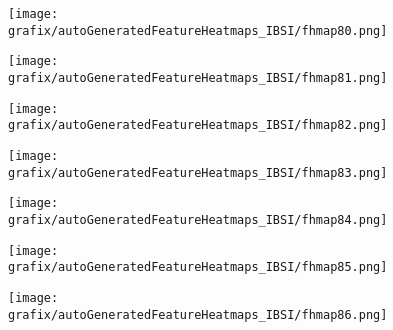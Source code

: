 \hspace{\hsp} 
\begin{subfigure}{\wid\textwidth} 
    \centering 
    \caption{\tiny \sffamily {}} 
    \vspace{\vsp} 
    \texttt{[image: grafix/autoGeneratedFeatureHeatmaps\_IBSI/fhmap80.png]} 
\end{subfigure} 
\hspace{\hsp} 
\begin{subfigure}{\wid\textwidth} 
    \centering 
    \caption{\tiny \sffamily {}} 
    \vspace{\vsp} 
    \texttt{[image: grafix/autoGeneratedFeatureHeatmaps\_IBSI/fhmap81.png]} 
\end{subfigure} 
\hspace{\hsp} 
\begin{subfigure}{\wid\textwidth} 
    \centering 
    \caption{\tiny \sffamily {}} 
    \vspace{\vsp} 
    \texttt{[image: grafix/autoGeneratedFeatureHeatmaps\_IBSI/fhmap82.png]} 
\end{subfigure} 
\hspace{\hsp} 
\begin{subfigure}{\wid\textwidth} 
    \centering 
    \caption{\tiny \sffamily {}} 
    \vspace{\vsp} 
    \texttt{[image: grafix/autoGeneratedFeatureHeatmaps\_IBSI/fhmap83.png]} 
\end{subfigure} 
\hspace{\hsp} 
\begin{subfigure}{\wid\textwidth} 
    \centering 
    \caption{\tiny \sffamily {}} 
    \vspace{\vsp} 
    \texttt{[image: grafix/autoGeneratedFeatureHeatmaps\_IBSI/fhmap84.png]} 
\end{subfigure} 
\hspace{\hsp} 
\begin{subfigure}{\wid\textwidth} 
    \centering 
    \caption{\tiny \sffamily {}} 
    \vspace{\vsp} 
    \texttt{[image: grafix/autoGeneratedFeatureHeatmaps\_IBSI/fhmap85.png]} 
\end{subfigure} 
\hspace{\hsp} 
\begin{subfigure}{\wid\textwidth} 
    \centering 
    \caption{\tiny \sffamily {}} 
    \vspace{\vsp} 
    \texttt{[image: grafix/autoGeneratedFeatureHeatmaps\_IBSI/fhmap86.png]} 
\end{subfigure} 

